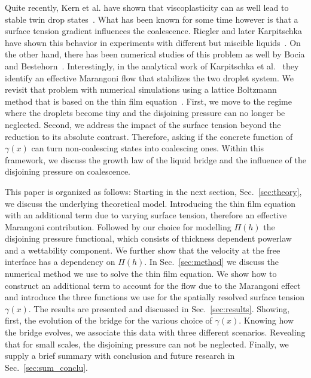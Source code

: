 \documentclass[twocolumn,amsmath,amssymb,showpacs,pre,nofootinbib,superscriptaddress]{revtex4-1} %
\begin{document}
Quite recently, Kern et al. have shown that viscoplasticity can as well lead to stable twin drop states~\cite{https://doi.org/10.48550/arxiv.2203.15617}.
What has been known for some time however is that a surface tension gradient influences the coalescence. 
Riegler and later Karpitschka have shown this behavior in experiments with different but miscible liquids~\cite{PhysRevLett.109.066103, doi:10.1021/la500459v, karpitschka2014sharp, bruning2018delayed}. 
On the other hand, there has been numerical studies of this problem as well by Bocia and Bestehorn~\cite{PhysRevE.82.036312, borcia2011coalescence}.
Interestingly, in the analytical work of Karpitschka et al.~\cite{PhysRevLett.109.066103} they identify an effective Marangoni flow that stabilizes the two droplet system.
We revisit that problem with numerical simulations using a lattice Boltzmann method that is based on the thin film equation~\cite{PhysRevE.100.033313}.
First, we move to the regime where the droplets become tiny and the disjoining pressure can no longer be neglected.
Second, we address the impact of the surface tension beyond the reduction to its absolute contrast.
Therefore, asking if the concrete function of $\gamma(x)$ can turn non-coalescing states into coalescing ones.
Within this framework, we discuss the growth law of the liquid bridge and the influence of the disjoining pressure on coalescence.

This paper is organized as follows:
Starting in the next section, Sec.~\ref{sec:theory}, we discuss the underlying theoretical model.
Introducing the thin film equation with an additional term due to varying surface tension, therefore an effective Marangoni contribution. 
Followed by our choice for modelling $\Pi(h)$ the disjoining pressure functional, which consists of thickness dependent powerlaw and a wettability component. 
We further show that the velocity at the free interface has a dependency on $\Pi(h)$.
In Sec.~\ref{sec:method} we discuss the numerical method we use to solve the thin film equation.
We show how to construct an additional term to account for the flow due to the Marangoni effect and
introduce the three functions we use for the spatially resolved surface tension $\gamma(x)$. 
The results are presented and discussed in Sec.~\ref{sec:results}.
Showing, first, the evolution of the bridge for the various choice of $\gamma(x)$.
Knowing how the bridge evolves, we associate this data with three different scenarios.
Revealing that for small scales, the disjoining pressure can not be neglected.
Finally, we supply a brief summary with conclusion and future research in Sec.~\ref{sec:sum_conclu}. 
\end{document}
